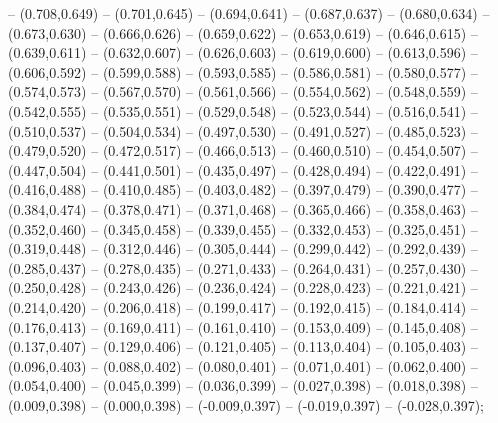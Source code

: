 -- (0.708,0.649) -- (0.701,0.645) -- (0.694,0.641) -- (0.687,0.637) -- (0.680,0.634) -- (0.673,0.630) -- (0.666,0.626) -- (0.659,0.622) -- (0.653,0.619) -- (0.646,0.615) -- (0.639,0.611) -- (0.632,0.607) -- (0.626,0.603) -- (0.619,0.600) -- (0.613,0.596) -- (0.606,0.592) -- (0.599,0.588) -- (0.593,0.585) -- (0.586,0.581) -- (0.580,0.577) -- (0.574,0.573) -- (0.567,0.570) -- (0.561,0.566) -- (0.554,0.562) -- (0.548,0.559) -- (0.542,0.555) -- (0.535,0.551) -- (0.529,0.548) -- (0.523,0.544) -- (0.516,0.541) -- (0.510,0.537) -- (0.504,0.534) -- (0.497,0.530) -- (0.491,0.527) -- (0.485,0.523) -- (0.479,0.520) -- (0.472,0.517) -- (0.466,0.513) -- (0.460,0.510) -- (0.454,0.507) -- (0.447,0.504) -- (0.441,0.501) -- (0.435,0.497) -- (0.428,0.494) -- (0.422,0.491) -- (0.416,0.488) -- (0.410,0.485) -- (0.403,0.482) -- (0.397,0.479) -- (0.390,0.477) -- (0.384,0.474) -- (0.378,0.471) -- (0.371,0.468) -- (0.365,0.466) -- (0.358,0.463) -- (0.352,0.460) -- (0.345,0.458) -- (0.339,0.455) -- (0.332,0.453) -- (0.325,0.451) -- (0.319,0.448) -- (0.312,0.446) -- (0.305,0.444) -- (0.299,0.442) -- (0.292,0.439) -- (0.285,0.437) -- (0.278,0.435) -- (0.271,0.433) -- (0.264,0.431) -- (0.257,0.430) -- (0.250,0.428) -- (0.243,0.426) -- (0.236,0.424) -- (0.228,0.423) -- (0.221,0.421) -- (0.214,0.420) -- (0.206,0.418) -- (0.199,0.417) -- (0.192,0.415) -- (0.184,0.414) -- (0.176,0.413) -- (0.169,0.411) -- (0.161,0.410) -- (0.153,0.409) -- (0.145,0.408) -- (0.137,0.407) -- (0.129,0.406) -- (0.121,0.405) -- (0.113,0.404) -- (0.105,0.403) -- (0.096,0.403) -- (0.088,0.402) -- (0.080,0.401) -- (0.071,0.401) -- (0.062,0.400) -- (0.054,0.400) -- (0.045,0.399) -- (0.036,0.399) -- (0.027,0.398) -- (0.018,0.398) -- (0.009,0.398) -- (0.000,0.398) -- (-0.009,0.397) -- (-0.019,0.397) -- (-0.028,0.397);
